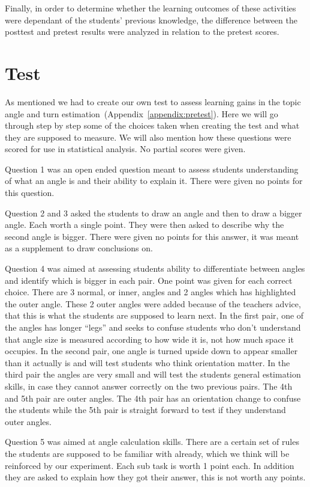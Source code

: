 \bigskip\noindent
Finally, in order to determine whether the learning outcomes of these activities were dependant of the students' previous knowledge, the difference between the posttest and pretest results were analyzed in relation to the pretest scores.

\section{Test}
As mentioned we had to create our own test to assess learning gains in the topic angle and turn estimation~(Appendix~\ref{appendix:pretest}). Here we will go through step by step some of the choices taken when creating the test and what they are supposed to measure. We will also mention how these questions were scored for use in statistical analysis. No partial scores were given.

\bigskip\noindent
Question 1 was an open ended question meant to assess students understanding of what an angle is and their ability to explain it. There were given no points for this question.

\bigskip\noindent
Question 2 and 3 asked the students to draw an angle and then to draw a bigger angle. Each worth a single point. They were then asked to describe why the second angle is bigger. There were given no points 
for this answer, it was meant as a supplement to draw conclusions on.

\bigskip\noindent
Question 4 was aimed at assessing students ability to differentiate between angles and identify which is bigger in each pair. One point was given for each correct choice. There are 3 normal, or inner, angles and 2 angles which has highlighted the outer angle. These 2 outer angles were added because of the teachers advice, that this is what the students are supposed to learn next. In the first pair, one of the angles has longer "`legs"' and seeks to confuse students who don't understand that angle size is measured according to how wide it is, not how much space it occupies. In the second pair, one angle is turned upside down to appear smaller than it actually is and will test students who think orientation matter. In the third pair the angles are very small and will test the students general estimation skills, in case they cannot answer correctly on the two previous pairs. The 4th and 5th pair are outer angles. The 4th pair has an orientation change to confuse the students while the 5th pair is straight forward to test if they understand outer angles. 

\bigskip\noindent
Question 5 was aimed at angle calculation skills. There are a certain set of rules the students are supposed to be familiar with already, which we think will be reinforced by our experiment. Each sub task is worth 1 point each. In addition they are asked to explain how they got their answer, this is not worth any points.

